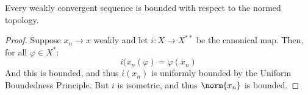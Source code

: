 \documentclass[crop=false,class=book,oneside]{standalone}                      %
\begin{document}
        \begin{theorem}
            Every weakly convergent sequence is bounded with
            respect to the normed topology.
        \end{theorem}
        \begin{proof}
            Suppose $x_{n}\rightarrow{x}$ weakly and let
            $i:X\rightarrow{X}^{**}$ be the canonical map. Then,
            for all $\varphi\in{X}^{*}$:
            \begin{equation}
                i(x_{n}(\varphi)=\varphi(x_{n})
            \end{equation}
            And this is bounded, and thus
            $i(x_{n})$ is uniformly bounded by the Uniform
            Boundedness Principle. But $i$ is isometric, and
            thus $\norm{x_{n}}$ is bounded.
        \end{proof}
\end{document}

